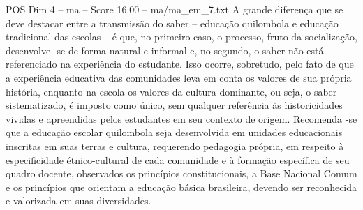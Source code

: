 \begin{textsample}{POS Dim 4 – ma – Score 16.00 – ma/ma\_em\_7.txt}
A grande diferença que se deve destacar entre a transmissão do saber – educação quilombola e educação tradicional das escolas – é que, no primeiro caso, o processo, fruto da socialização, desenvolve -se de forma natural e informal e, no segundo, o saber não está referenciado na experiência do estudante.
Isso ocorre, sobretudo, pelo fato de que a experiência educativa das comunidades leva em conta os valores de sua própria história, enquanto na escola os valores da cultura dominante, ou seja, o saber sistematizado, é imposto como único, sem qualquer referência às historicidades vividas e apreendidas pelos estudantes em seu contexto de origem.
Recomenda -se que a educação escolar quilombola seja desenvolvida em unidades educacionais inscritas em suas terras e cultura, requerendo pedagogia própria, em respeito à especificidade étnico-cultural de cada comunidade e à formação específica de seu quadro docente, observados os princípios constitucionais, a Base Nacional Comum e os princípios que orientam a educação básica brasileira, devendo ser reconhecida e valorizada em suas diversidades.

\end{textsample}
